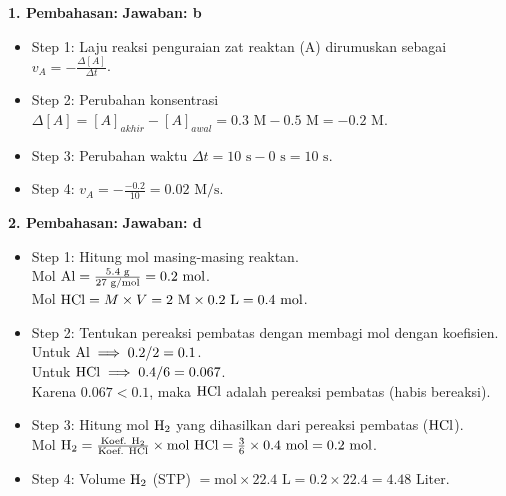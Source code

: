 \documentclass[12pt,a4paper]{article}
\begin{document}
\textbf{1. Pembahasan:} \hfill \textbf{Jawaban: b}
\begin{itemize}
    \item Step 1: Laju reaksi penguraian zat reaktan (A) dirumuskan sebagai $v_A = -\frac{\Delta[A]}{\Delta t}$.
    \item Step 2: Perubahan konsentrasi $\Delta[A] = [A]_{akhir} - [A]_{awal} = 0.3 \text{ M} - 0.5 \text{ M} = -0.2 \text{ M}$.
    \item Step 3: Perubahan waktu $\Delta t = 10 \text{ s} - 0 \text{ s} = 10 \text{ s}$.
    \item Step 4: $v_A = -\frac{-0.2}{10} = 0.02 \text{ M/s}$.
\end{itemize}

\textbf{2. Pembahasan:} \hfill \textbf{Jawaban: d}
\begin{itemize}
    \item Step 1: Hitung mol masing-masing reaktan. \\
    Mol $\ce{Al} = \frac{5.4 \text{ g}}{27 \text{ g/mol}} = 0.2 \text{ mol}$. \\
    Mol $\ce{HCl} = M \times V = 2 \text{ M} \times 0.2 \text{ L} = 0.4 \text{ mol}$.
    \item Step 2: Tentukan pereaksi pembatas dengan membagi mol dengan koefisien. \\
    Untuk $\ce{Al} \implies 0.2 / 2 = 0.1$. \\
    Untuk $\ce{HCl} \implies 0.4 / 6 = 0.067$. \\
    Karena $0.067 < 0.1$, maka $\ce{HCl}$ adalah pereaksi pembatas (habis bereaksi).
    \item Step 3: Hitung mol $\ce{H2}$ yang dihasilkan dari pereaksi pembatas ($\ce{HCl}$). \\
    Mol $\ce{H2} = \frac{\text{Koef. H}_2}{\text{Koef. HCl}} \times \text{mol HCl} = \frac{3}{6} \times 0.4 \text{ mol} = 0.2 \text{ mol}$.
    \item Step 4: Volume $\ce{H2}$ (STP) $= \text{mol} \times 22.4 \text{ L} = 0.2 \times 22.4 = 4.48 \text{ Liter}$.
\end{itemize}
\end{document}
